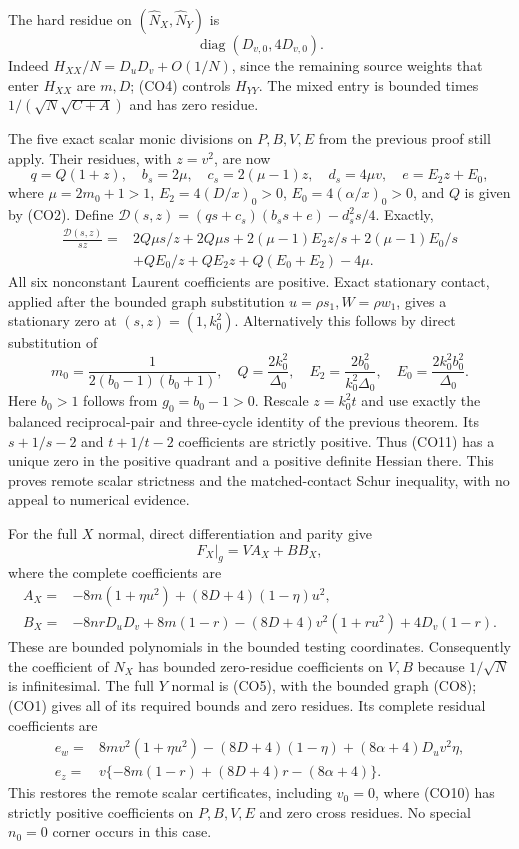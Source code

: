 The hard residue on $(\widehat N_X,\widehat N_Y)$ is
\[
                  \operatorname{diag}(D_{v,0},4D_{v,0}). \tag{CO9}
\]
Indeed $H_{XX}/N=D_uD_v+O(1/N)$, since the remaining source
weights that enter $H_{XX}$ are $m,D$; (CO4) controls $H_{YY}$.
The mixed entry is bounded times
$1/(\sqrt N\sqrt{C+A})$ and has zero residue.

The five exact scalar monic divisions on $P,B,V,E$ from the previous
proof still apply.  Their residues, with $z=v^2$, are now
\[
 q=Q(1+z),\quad b_s=2\mu,\quad c_s=2(\mu-1)z,
 \quad d_s=4\mu v,\quad e=E_2z+E_0,                    \tag{CO10}
\]
where $\mu=2m_0+1>1$, $E_2=4(D/x)_0>0$,
$E_0=4(\alpha/x)_0>0$, and $Q$ is given by (CO2).
Define
$\mathcal D(s,z)=(qs+c_s)(b_ss+e)-d_s^2s/4$.
Exactly,
\begin{align*}
 \frac{\mathcal D(s,z)}{sz}={}&
 2Q\mu s/z+2Q\mu s
 +2(\mu-1)E_2z/s+2(\mu-1)E_0/s\\
 &+QE_0/z+QE_2z+Q(E_0+E_2)-4\mu.                    \tag{CO11}
\end{align*}
All six nonconstant Laurent coefficients are positive.  Exact
stationary contact, applied after the bounded graph substitution
$u=\rho s_1,W=\rho w_1$, gives a stationary zero at
$(s,z)=(1,k_0^2)$.  Alternatively this follows by direct substitution
of
\[
 m_0=\frac1{2(b_0-1)(b_0+1)},\quad
 Q=\frac{2k_0^2}{\Delta_0},\quad
 E_2=\frac{2b_0^2}{k_0^2\Delta_0},\quad
 E_0=\frac{2k_0^2b_0^2}{\Delta_0}.
\]
Here $b_0>1$ follows from $g_0=b_0-1>0$.
Rescale $z=k_0^2t$ and use exactly the balanced reciprocal-pair and
three-cycle identity of the previous theorem.  Its $s+1/s-2$ and
$t+1/t-2$ coefficients are strictly positive.  Thus (CO11) has a
unique zero in the positive quadrant and a positive definite Hessian
there.  This proves remote scalar strictness and the matched-contact
Schur inequality, with no appeal to numerical evidence.

For the full $X$ normal, direct differentiation and parity give
\[
 \left.F_X\right|_g=V A_X+B B_X,
\]
where the complete coefficients are
\begin{align*}
 A_X={}&-8m(1+\eta u^2)+(8D+4)(1-\eta)u^2,\\
 B_X={}&-8nrD_uD_v+8m(1-r)
       -(8D+4)v^2(1+ru^2)+4D_v(1-r).
\end{align*}
These are bounded polynomials in the bounded testing coordinates.
Consequently the coefficient of $\widehat N_X$ has bounded
zero-residue coefficients on $V,B$ because $1/\sqrt N$ is
infinitesimal.  The full $Y$ normal is (CO5), with the bounded
graph (CO8); (CO1) gives all of its required bounds and zero residues.
Its complete residual coefficients are
\begin{align*}
 e_w={}&8mv^2(1+\eta u^2)-(8D+4)(1-\eta)
                     +(8\alpha+4)D_uv^2\eta,\\
 e_z={}&v\{-8m(1-r)+(8D+4)r-(8\alpha+4)\}.
\end{align*}
This restores the remote scalar certificates, including $v_0=0$,
where (CO10) has strictly positive coefficients on $P,B,V,E$ and
zero cross residues.  No special $n_0=0$ corner occurs in this case.

